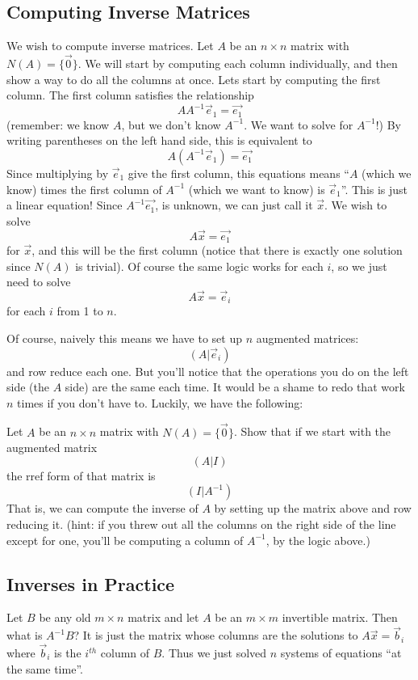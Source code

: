 \subsection{Computing Inverse Matrices}

We wish to compute inverse matrices.
Let $A$ be an $n\times n$ matrix with $N(A)=\{\vec{0}\}$.  
We will start by computing each column individually, and then show a way to do all the columns at once.
Lets start by computing the first column.
The first column satisfies the relationship
\[AA^{-1}\vec{e}_1=\vec{e_1}\]
(remember: we know $A$, but we don't know $A^{-1}$.  We want to solve for $A^{-1}$!)
By writing parentheses on the left hand side, this is equivalent to
\[A(A^{-1}\vec{e}_1)=\vec{e_1}\]
Since multiplying by $\vec{e}_1$ give the first column, this equations means ``$A$ (which we know) times the first column of $A^{-1}$ (which we want to know) is $\vec{e}_1$''.
This is just a linear equation!
Since $A^{-1}\vec{e_1}$, is unknown, we can just call it $\vec{x}$.  We wish to solve
\[A\vec{x}=\vec{e_1}\]
for $\vec{x}$, and this will be the first column (notice that there is exactly one solution since $N(A)$ is trivial).  
Of course the same logic works for each $i$, so we just need to solve
\[A\vec{x}=\vec{e}_i\]
for each $i$ from 1 to $n$.

Of course, naively this means we have to set up $n$ augmented matrices:
\[\left(A \right|\left.\vec{e}_i\right)\]
and row reduce each one.
But you'll notice that the operations you do on the left side (the $A$ side) are the same each time.
It would be a shame to redo that work $n$ times if you don't have to.
Luckily, we have the following:
\begin{Ex}
  Let $A$ be an $n\times n$ matrix with $N(A)=\{\vec{0}\}$.  
  Show that if we start with the augmented matrix
  \[\left(A\right|\left.I\right)\]
  the rref form of that matrix is
  \[\left(I\right|\left.A^{-1}\right)\]
  That is, we can compute the inverse of $A$ by setting up the matrix above and row reducing it.
  (hint: if you threw out all the columns on the right side of the line except for one, you'll be computing a column of $A^{-1}$, by the logic above.)
\end{Ex}



\subsection{Inverses in Practice}

\begin{Example}
  Let $B$ be any old $m\times n$ matrix and let $A$ be an $m\times m$ invertible matrix.
  Then what is $A^{-1}B$?
  It is just the matrix whose columns are the solutions to $A\vec{x}=\vec{b}_i$ where $\vec{b}_i$ is the $i^{th}$ column of $B$.
  Thus we just solved $n$ systems of equations ``at the same time''.  
\end{Example}

